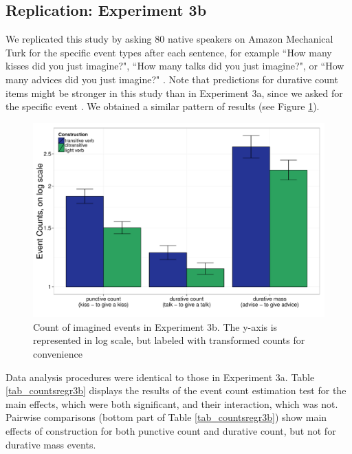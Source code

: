 \documentclass[review,12pt,authoryear]{elsarticle}
\newcommand*{\sectionformat}{\centering}
\begin{document}
\subsection*{\sectionformat Replication: Experiment 3b}\label{repl_HowMany}
We replicated this study by asking 80 native speakers on Amazon Mechanical Turk for the  specific event types  after each sentence, for example ``How many kisses did you just imagine?", ``How many talks did you just imagine?", or ``How many advices did you just imagine?" . Note that predictions for durative count items might be stronger in this study than in Experiment 3a, since we asked for the specific event . We obtained a similar pattern of results (see Figure \ref{fig_resCount3b}).

\begin{figure}
\centering
\includegraphics[width=1\textwidth]{./Figures/Exp3b_EventCountsBar.pdf}
\caption{Count of imagined events in Experiment 3b. The y-axis is represented in log scale, but labeled with transformed counts  for convenience }
\label{fig_resCount3b}
\end{figure}

Data analysis procedures were identical to those in Experiment 3a. Table \ref{tab_countsregr3b} displays the results of the event count estimation test for the main effects, which were both significant, and their interaction, which was not. Pairwise comparisons (bottom part of Table \ref{tab_countsregr3b}) show main effects of construction for both punctive count and durative count, but not for durative mass events. 
\end{document}

